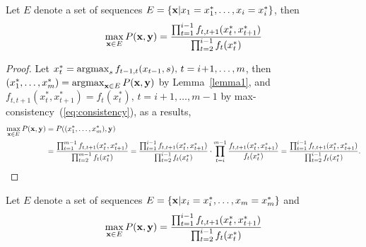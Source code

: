 \begin{lemma}
\label{lemma3}
Let $E$ denote a set of sequences $E = \{\mathbf{x} |x_1 = x_1^*, \dots, x_i = x_i^*\}$, then
\begin{equation*}
\max_{\mathbf{x} \in E} P(\mathbf{x},\mathbf{y}) = \frac{\prod_{t=1}^{i-1} f_{t,t+1}(x_t^*, x_{t+1}^*)} {\prod_{t=2}^{i-1} f_t(x_t^*)}
\end{equation*}
\end{lemma}

\begin{proof}
Let $x_t^* = \operatorname*{argmax}_{s} f_{t-1, t}(x_{t-1}, s), \, t = i\!+\!1,\dots,m$, 
then $(x_1^*,\dots,x_m^*) = \operatorname*{argmax}_{\mathbf{x} \in E} P(\mathbf{x},\mathbf{y})$ by Lemma~\ref{lemma1},
and $f_{t,t+1}(x_t^*, x_{t+1}^*) = f_{t}(x_t^*), \, t = i\!+\!1,\dots,m\!-\!1$ by max-consistency~(\ref{eq:consistency}),
as a results,
\begin{align*}
\max_{\x \in E} P(\x,\y) &= P((x_1^*,\dots,x_m^*), \y) \\
&= \frac{\prod_{t=1}^{m-1} f_{t,t+1}(x_t^*, x_{t+1}^*)} {\prod_{t=2}^{m-1} f_t(x_t^*)} %
= \frac{\prod_{t=1}^{i-1} f_{t,t+1}(x_t^*, x_{t+1}^*)} {\prod_{t=2}^{i-1} f_t(x_t^*)} \cdot
  \prod_{t=i}^{m-1} \frac{f_{t,t+1}(x_t^*, x_{t+1}^*)} {f_t(x_t^*)}                   %
= \frac{\prod_{t=1}^{i-1} f_{t,t+1}(x_t^*, x_{t+1}^*)} {\prod_{t=2}^{i-1} f_t(x_t^*)}.
\end{align*}
\end{proof}

\begin{lemma}
\label{lemma4}
Let $E$ denote a set of sequences $E = \{\mathbf{x} |x_i = x_i^*, \dots, x_m = x_m^*\}$ and
\begin{equation*}
\max_{\mathbf{x} \in E} P(\mathbf{x},\mathbf{y}) = \frac{\prod_{t=1}^{i-1} f_{t,t+1}(x_t^*, x_{t+1}^*)} {\prod_{t=2}^{i-1} f_t(x_t^*)}
\end{equation*}
\end{lemma}

